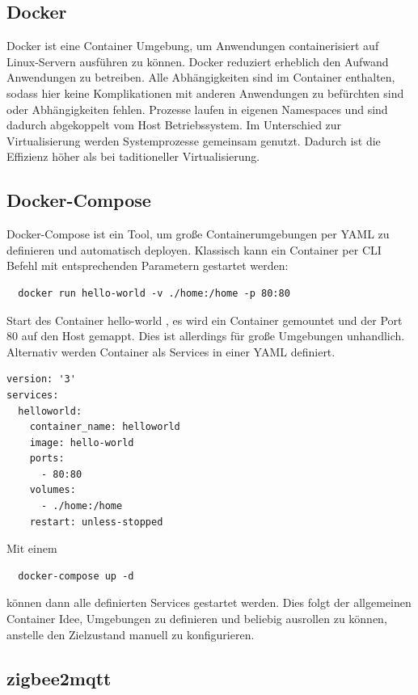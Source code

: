 \subsection{Docker}

Docker ist eine Container Umgebung, um Anwendungen containerisiert auf Linux-Servern ausführen zu können. Docker reduziert erheblich den Aufwand 
Anwendungen zu betreiben. Alle Abhängigkeiten sind im Container enthalten, sodass hier keine Komplikationen mit anderen Anwendungen
zu befürchten sind oder Abhängigkeiten fehlen. Prozesse laufen in eigenen Namespaces und sind dadurch abgekoppelt vom Host Betriebssystem. Im Unterschied zur Virtualisierung werden
Systemprozesse gemeinsam genutzt. Dadurch ist die Effizienz höher als bei taditioneller Virtualisierung.

\subsection{Docker-Compose}

Docker-Compose ist ein Tool, um große Containerumgebungen per YAML zu definieren und automatisch deployen. Klassisch kann ein Container 
per CLI Befehl mit entsprechenden Parametern gestartet werden:
\begin{lstlisting}
  docker run hello-world -v ./home:/home -p 80:80
\end{lstlisting}
Start des Container \grqq hello-world \grqq{}, es wird ein Container gemountet und der Port 80 auf den Host gemappt.
Dies ist allerdings für große Umgebungen unhandlich. Alternativ werden Container als Services in einer YAML definiert.

\begin{lstlisting}
version: '3'
services:
  helloworld:
    container_name: helloworld
    image: hello-world
    ports:
      - 80:80
    volumes:
      - ./home:/home
    restart: unless-stopped
\end{lstlisting}

Mit einem 
\begin{lstlisting}
  docker-compose up -d
\end{lstlisting}

können dann alle definierten Services gestartet werden. Dies folgt der allgemeinen Container Idee, Umgebungen zu definieren und beliebig ausrollen 
zu können, anstelle den Zielzustand manuell zu konfigurieren.

\subsection{zigbee2mqtt}

